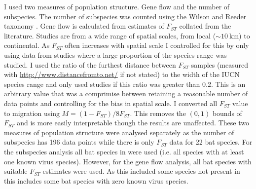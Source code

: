 I used two measures of population structure. 
Gene flow and the number of subspecies.
The number of subspecies was counted using the Wilson and Reeder taxonomy \cite{wilson2005mammal}.
Gene flow is calculated from estimates of $F_{ST}$ collated from the literature.
Studies are from a wide range of spatial scales, from local ($\sim\SI{10}{\kilo\metre}$) to continental.
As $F_{ST}$ often increases with spatial scale \cite{burland1999population, hulva2010mechanisms, o2015genetic, vonhof2015range} I controlled for this by only using data from studies where a large proportion of the species range was studied.
I used the ratio of the furthest distance between $F_{ST}$ samples (measured with \url{http://www.distancefromto.net/} if not stated) to the width of the IUCN species range \cite{iucn} and only used studies if this ratio was greater than 0.2.
This is an arbitrary value that was a comprimise between retaining a reasonable number of data points and controlling for the bias in spatial scale.
I converted all $F_{ST}$ value to migration using $M = (1-F_{ST})/8F_{ST}$.
This removes the $(0, 1)$ bounds of $F_{ST}$ and is more easily interpretable though the results are unaffected. 
These two measures of population structure were analysed separately as the number of subspecies has 196 data points while there is only $F_{ST}$ data for 22 bat species.
For the subspecies analysis all bat species in \textcite{luis2013comparison} were used (i.e. all species with at least one known virus species).
However, for the gene flow analysis, all bat species with suitable $F_{ST}$ estimates were used.
As this included some species not present in \textcite{luis2013comparison} this includes some bat species with zero known virus species. 




























